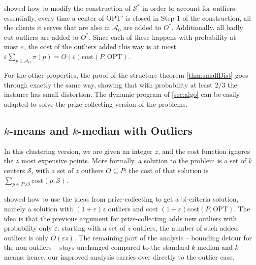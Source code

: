 \documentclass[11pt]{article}
\newcommand{\opt}{\text{OPT}}
\newcommand{\eps}{\varepsilon}
\newcommand{\cost}{\mathrm{cost}}
\newcommand{\calS}{\mathcal {S}}
\newcommand{\calL}{\mathcal{A}}
\begin{document}
\cite{jacm} showed how to modify the construction of $\calS^*$ in order to account for outliers: essentially, every time a center of $\opt'$ is closed in Step 1 of the construction, all the clients it serves that are also in $\calL_0$ are added to $O^*$. Additionally, all badly cut outliers are added to $O^*$. Since each of these happens with probability at most $\eps$, the cost of the outliers added this way is at most $\eps \sum_{p \in \calL_O} \pi(p) = O(\eps)\cost(P, \opt)$.

For the other properties, the proof of the structure theorem \cref{thm:smallDist} goes through exactly the same way, showing that with probability at least $2/3$ the instance has small distortion. The dynamic program of \cref{sec:algo} can be easily adapted to solve the prize-collecting version of the problems.


\subsection{$k$-means and $k$-median with Outliers}
In this clustering version, we are given an integer $z$, and the cost function ignores the $z$ most expensive points. More formally, a solution to the problem is a set of $k$ centers $\calS$, with a set of $z$ outliers $O \subseteq P$: the cost of that solution is $\sum_{p \in P \setminus O} \cost(p, \calS)$.

\cite{jacm} showed how to use the ideas from prize-collecting to get a bi-criteria solution, namely a solution with $(1+\eps)z$ outliers and cost $(1+\eps) \cost(P, \opt)$. The idea is that the previous argument for prize-collecting adds new outliers with probability only $\eps$: starting with a set of $z$ outliers, the number of such added outliers is only $O(\eps z)$. The remaining part of the analysis -- bounding detour for the non-outliers -- stays unchanged compared to the standard $k$-median and $k$-means: hence, our improved analysis carries over directly to the outlier case.
\end{document}
